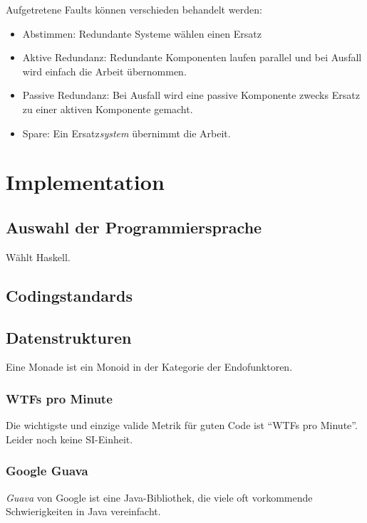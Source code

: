 \documentclass[a4paper,parskip=half*,DIV=7,fontsize=11pt]{scrartcl}
\begin{document}
Aufgetretene Faults können verschieden behandelt werden: \begin{itemize}
\item Abstimmen: Redundante Systeme wählen einen Ersatz
\item Aktive Redundanz: Redundante Komponenten laufen parallel und bei Ausfall wird einfach die Arbeit übernommen.
\item Passive Redundanz: Bei Ausfall wird eine passive Komponente zwecks Ersatz zu einer aktiven Komponente gemacht.
\item Spare: Ein Ersatz\emph{system} übernimmt die Arbeit.
\end{itemize}

\section{Implementation}

\subsection{Auswahl der Programmiersprache}

Wählt Haskell.

\subsection{Codingstandards}


\subsection{Datenstrukturen}

Eine Monade ist ein Monoid in der Kategorie der Endofunktoren. %

\subsubsection{WTFs pro Minute}
Die wichtigste und einzige valide Metrik für guten Code ist ``WTFs pro Minute''. Leider noch keine SI-Einheit.

\subsubsection{Google Guava}
\label{sec:guava}

\emph{Guava} von Google ist eine Java-Bibliothek, die viele oft vorkommende Schwierigkeiten in Java vereinfacht.
\end{document}
